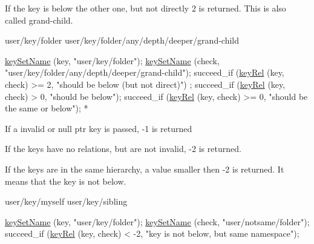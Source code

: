 \begin{DoxyItemize}
\item If the key is below the other one, but not directly 2 is returned. This is also called grand-\/child. \begin{DoxyVerb}user/key/folder
user/key/folder/any/depth/deeper/grand-child
\end{DoxyVerb}

\end{DoxyItemize}


\begin{DoxyCode}
\hyperlink{group__keyname_ga7699091610e7f3f43d2949514a4b35d9}{keySetName} (key, \textcolor{stringliteral}{"user/key/folder"});
\hyperlink{group__keyname_ga7699091610e7f3f43d2949514a4b35d9}{keySetName} (check, \textcolor{stringliteral}{"user/key/folder/any/depth/deeper/grand-child"});
succeed\_if (\hyperlink{group__keytest_ga6bb0f95ac34ce9c42d61bb35a76139d0}{keyRel} (key, check) >= 2, \textcolor{stringliteral}{"should be below (but not direct)"})
      ;
succeed\_if (\hyperlink{group__keytest_ga6bb0f95ac34ce9c42d61bb35a76139d0}{keyRel} (key, check) > 0, \textcolor{stringliteral}{"should be below"});
succeed\_if (\hyperlink{group__keytest_ga6bb0f95ac34ce9c42d61bb35a76139d0}{keyRel} (key, check) >= 0, \textcolor{stringliteral}{"should be the same or below"});
 *
\end{DoxyCode}



\begin{DoxyItemize}
\item If a invalid or null ptr key is passed, -\/1 is returned
\end{DoxyItemize}


\begin{DoxyItemize}
\item If the keys have no relations, but are not invalid, -\/2 is returned.
\end{DoxyItemize}


\begin{DoxyItemize}
\item If the keys are in the same hierarchy, a value smaller then -\/2 is returned. It means that the key is not below. \begin{DoxyVerb}user/key/myself
user/key/sibling
\end{DoxyVerb}

\end{DoxyItemize}


\begin{DoxyCode}
\hyperlink{group__keyname_ga7699091610e7f3f43d2949514a4b35d9}{keySetName} (key, \textcolor{stringliteral}{"user/key/folder"});
\hyperlink{group__keyname_ga7699091610e7f3f43d2949514a4b35d9}{keySetName} (check, \textcolor{stringliteral}{"user/notsame/folder"});
succeed\_if (\hyperlink{group__keytest_ga6bb0f95ac34ce9c42d61bb35a76139d0}{keyRel} (key, check) < -2, \textcolor{stringliteral}{"key is not below, but same
       namespace"});
\end{DoxyCode}



